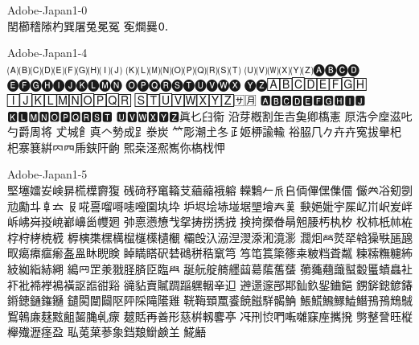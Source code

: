 %
%
%
%


Adobe-Japan1-0\\
𨳝櫛𥡴𨻶杓巽屠兔冕冤
𡨚𤏐爨🄀

Adobe-Japan1-4\\
🄐🄑🄒🄓🄔🄕🄖🄗🄘🄙
🄚🄛🄜🄝🄞🄟🄠🄡🄢🄣
🄤🄥🄦🄧🄨🄩🅐🅑🅒🅓
🅔🅕🅖🅗🅘🅙🅚🅛🅜🅝
🅞🅟🅠🅡🅢🅣🅤🅥🅦🅧
🅨🅩🄰🄱🄲🄳🄴🄵🄶🄷
🄸🄹🄺🄻🄼🄽🄾🄿🅀🅁
🅂🅃🅄🅅🅆🅇🅈🅉🈂🈷
🅰🅱🅲🅳🅴🅵🅶🅷🅸🅹
🅺🅻🅼🅽🅾🅿🆀🆁🆂🆃
🆄🆅🆆🆇🆈🆉眞𠤎𦥑𫟘
沿芽槪割𦈢𠮷𩵋卿𫞎憲
𠩤浩𫝆𫝷滋𠮟勺爵周将
𠀋城𩙿真𠆢𫝑成𧾷𣳾炭
𥫗彫潮𡈽冬𤴔姬𫞉諭輸
𥙿𦚰𠘨𠂊𠦄卉寃拔𦦙𣏌
杞𪧦𫞽絣𠔿𦉪𠂰𨦇𨸗𫠚
𤋮桒𣲾𠘑嶲你𣘺𣏾𢘉

Adobe-Japan1-5\\
𡌛𡑮𡢽𡚴𡸴𣇄𣗄𣜿𣝣𤟱
𥒎𥔎𥝱𥧄𥶡𦫿𦹀𧃴𧚄𨉷
𨏍𪆐𠂉𠂢𠂤𠈓𠌫𠎁𠍱𠏹
𠑊𠔉𠗖𠝏𠠇𠠺𠢹𠥼𠦝𠫓
𠬝𠵅𠷡𠺕𠹭𠹤𠽟𡈁𡉕𡉻
𡉴𡋤𡋗𡋽𡌶𡍄𡏄𡑭𡗗𦰩
𡙇𡜆𡝂𡧃𡱖𡴭𡵅𡵸𡵢𡶡
𡶜𡶒𡶷𡷠𡸳𡼞𡽶𡿺𢅻𢌞
𢎭𢛳𢡛𢢫𢦏𢪸𢭏𢭐𢭆𢰝
𢮦𢰤𢷡𣇃𣇵𣆶𣍲𣏓𣏒𣏐
𣏤𣏕𣏚𣏟𣑊𣑑𣑋𣑥𣓤𣕚
𣖔𣘹𣙇𣘸𣜜𣜌𣝤𣟿𣟧𣠤
𣠽𣪘𣱿𣴀𣵀𣷺𣷹𣷓𣽾𤂖
𤄃𤇆𤇾𤎼𤘩𤚥𤢖𤩍𤭖𤭯
𤰖𤸎𤸷𤹪𤺋𥁊𥁕𥄢𥆩𥇥
𥇍𥈞𥉌𥐮𥓙𥖧𥞩𥞴𥧔𥫤
𥫣𥫱𥮲𥱋𥱤𥸮𥹖𥹥𥹢𥻘
𥻂𥻨𥼣𥽜𥿠𥿔𦀌𥿻𦀗𦁠
𦃭𦉰𦊆𣴎𦐂𦙾𦜝𦣝𦣪𦥯
𦧝𦨞𦩘𦪌𦪷𦱳𦳝𦹥𦾔𦿸
𦿶𦿷𧄍𧄹𧏛𧏚𧏾𧐐𧑉𧘕
𧘔𧘱𧚓𧜎𧜣𧝒𧦅𧪄𧮳𧮾
𧯇𧲸𧶠𧸐𨂊𨂻𨊂𨋳𨐌𨑕
𨕫𨗈𨗉𨛗𨛺𨥉𨥆𨥫𨦈𨦺
𨦻𨨞𨨩𨩱𨩃𨪙𨫍𨫤𨫝𨯁
𨯯𨴐𨵱𨷻𨸟𨸶𨺉𨻫𨼲𨿸
𩊠𩊱𩒐𩗏𩛰𩜙𩝐𩣆𩩲𩷛
𩸕𩺊𩹉𩻄𩻩𩻛𩿎𩿗𪀯𪀚
𪃹𪂂𢈘𪎌𪐷𪗱𪘂𪚲𠃵𤸄
𤿲𧵳再善形慈栟軔𪊲𠅘
𠖱𠛬𫝓𠵘𫝚𫝜𥧌𫝶𢹂𫝼
𠟈𢿫𧦴𫞂𫞋𣟱𫞔𤁋𫞬𫞯
𫟉𫟏𫟒𦲞𧰼𫟰𫝥𫠍𫠗𦍌
𩸽𪘚

